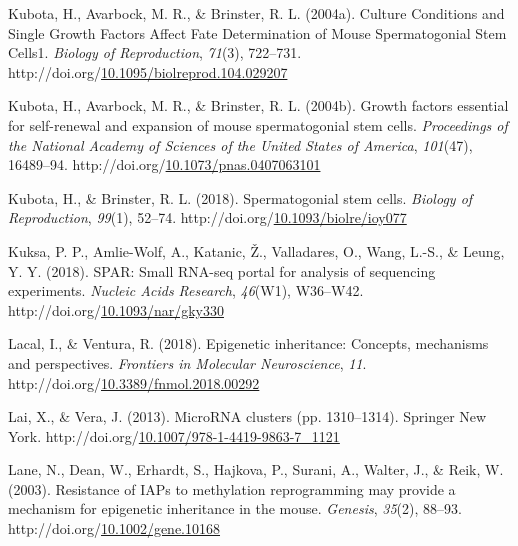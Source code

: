 \documentclass[12pt,twoside]{reedthesis}
\newlength{\cslhangindent}
\newenvironment{CSLReferences}[2] %
 {%
  \setlength{\parindent}{0pt}
  \ifodd #1 \everypar{\setlength{\hangindent}{\cslhangindent}}\ignorespaces\fi
  \ifnum #2 > 0
  \setlength{\parskip}{#2\baselineskip}
  \fi
 }%
 {}
\begin{document}
\begin{CSLReferences}{1}{0}
\leavevmode{}%
Kubota, H., Avarbock, M. R., \& Brinster, R. L. (2004a). Culture Conditions and Single Growth Factors Affect Fate Determination of Mouse Spermatogonial Stem Cells1. \emph{Biology of Reproduction}, \emph{71}(3), 722--731. http://doi.org/\href{https://doi.org/10.1095/biolreprod.104.029207}{10.1095/biolreprod.104.029207}

\leavevmode{}%
Kubota, H., Avarbock, M. R., \& Brinster, R. L. (2004b). Growth factors essential for self-renewal and expansion of mouse spermatogonial stem cells. \emph{Proceedings of the National Academy of Sciences of the United States of America}, \emph{101}(47), 16489--94. http://doi.org/\href{https://doi.org/10.1073/pnas.0407063101}{10.1073/pnas.0407063101}

\leavevmode{}%
Kubota, H., \& Brinster, R. L. (2018). Spermatogonial stem cells{\textdagger}. \emph{Biology of Reproduction}, \emph{99}(1), 52--74. http://doi.org/\href{https://doi.org/10.1093/biolre/ioy077}{10.1093/biolre/ioy077}

\leavevmode{}%
Kuksa, P. P., Amlie-Wolf, A., Katanic, Ž., Valladares, O., Wang, L.-S., \& Leung, Y. Y. (2018). SPAR: Small RNA-seq portal for analysis of sequencing experiments. \emph{Nucleic Acids Research}, \emph{46}(W1), W36--W42. http://doi.org/\href{https://doi.org/10.1093/nar/gky330}{10.1093/nar/gky330}

\leavevmode{}%
Lacal, I., \& Ventura, R. (2018). Epigenetic inheritance: Concepts, mechanisms and perspectives. \emph{Frontiers in Molecular Neuroscience}, \emph{11}. http://doi.org/\href{https://doi.org/10.3389/fnmol.2018.00292}{10.3389/fnmol.2018.00292}

\leavevmode{}%
Lai, X., \& Vera, J. (2013). MicroRNA clusters (pp. 1310--1314). Springer New York. http://doi.org/\href{https://doi.org/10.1007/978-1-4419-9863-7_1121}{10.1007/978-1-4419-9863-7\_1121}

\leavevmode{}%
Lane, N., Dean, W., Erhardt, S., Hajkova, P., Surani, A., Walter, J., \& Reik, W. (2003). Resistance of IAPs to methylation reprogramming may provide a mechanism for epigenetic inheritance in the mouse. \emph{Genesis}, \emph{35}(2), 88--93. http://doi.org/\href{https://doi.org/10.1002/gene.10168}{10.1002/gene.10168}


\end{CSLReferences}
\end{document}
